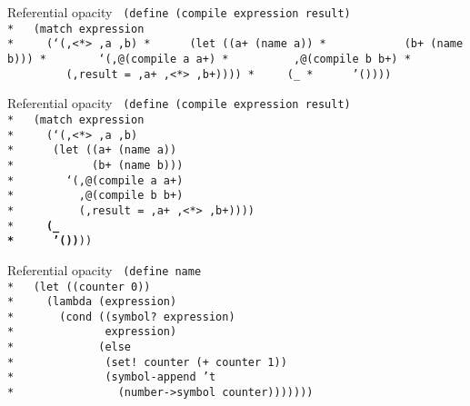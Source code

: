 \begin{frame}{Referential opacity}
  \texttt{
    (define (compile expression result) \\*
    \ \ (match expression \\*
    \ \ \ \ (`(,<*> ,a ,b) \\*
    \ \ \ \ \ (let ((a+ (name a)) \\*
    \ \ \ \ \ \ \ \ \ \ \ (b+ (name b))) \\*
    \ \ \ \ \ \ \ \textbf{`(,@(compile a a+)\\*
    \ \ \ \ \ \ \ \ \ ,@(compile b b+)\\*
    \ \ \ \ \ \ \ \ \ (,result = ,a+ ,<*> ,b+))}))\\*
    \ \ \ \ (\_\\*
    \ \ \ \ \ '())))
  }
\end{frame}

\begin{frame}{Referential opacity}
  \texttt{
    (define (compile expression result) \\*
    \ \ (match expression \\*
    \ \ \ \ (`(,<*> ,a ,b) \\*
    \ \ \ \ \ (let ((a+ (name a)) \\*
    \ \ \ \ \ \ \ \ \ \ \ (b+ (name b))) \\*
    \ \ \ \ \ \ \ `(,@(compile a a+)\\*
    \ \ \ \ \ \ \ \ \ ,@(compile b b+)\\*
    \ \ \ \ \ \ \ \ \ (,result = ,a+ ,<*> ,b+))))\\*
    \ \ \ \ \textbf{(\_\\*
    \ \ \ \ \ '())}))
  }
\end{frame}

\begin{frame}{Referential opacity}
  \texttt{
    (define name \\*
    \ \ (let ((counter 0)) \\*
    \ \ \ \ (lambda (expression)\\*
    \ \ \ \ \ \ (cond ((symbol? expression)\\*
    \ \ \ \ \ \ \ \ \ \ \ \ \ expression)\\*
    \ \ \ \ \ \ \ \ \ \ \ \ (else\\*
    \ \ \ \ \ \ \ \ \ \ \ \ \ (set! counter (+ counter 1))\\*
    \ \ \ \ \ \ \ \ \ \ \ \ \ (symbol-append 't\\*
    \ \ \ \ \ \ \ \ \ \ \ \ \ \ \ (number->symbol counter)))))))
  }
\end{frame}

